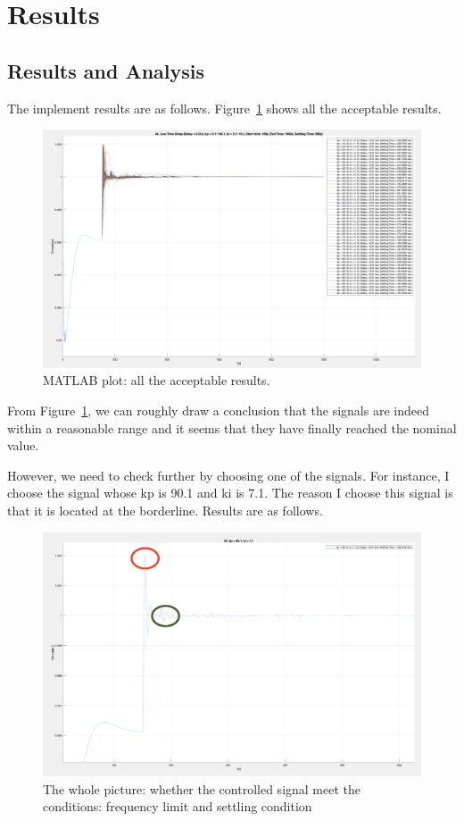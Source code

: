 \section{Results} %
\label{section4.4}
\subsection{Results and Analysis} %
The implement results are as follows. Figure~\ref{4_4_1_result1} shows all the acceptable results.

\begin{figure}[htbp]
\centering
\includegraphics[width = .819\textwidth]{figure/4_4_1_result1.png}
\caption{MATLAB plot: all the acceptable results.}
\label{4_4_1_result1}
\end{figure}

From Figure~\ref{4_4_1_result1}, we can roughly draw a conclusion that the signals are indeed within a reasonable range and it seems that they have finally reached the nominal value.

However, we need to check further by choosing one of the signals. For instance, I choose the signal whose kp is 90.1 and ki is 7.1. The reason I choose this signal is that it is located at the borderline. Results are as follows.\\

\begin{figure}[htbp]
\centering
\includegraphics[width = .819\textwidth]{figure/4_4_1_result2.png}
\caption{The whole picture: whether the controlled signal meet the conditions: frequency limit and settling condition}
\label{4_4_1_result2}
\end{figure}

